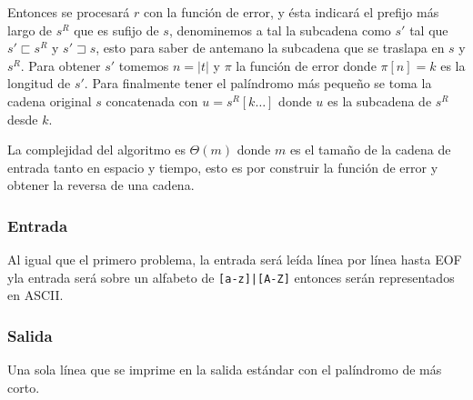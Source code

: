 Entonces se procesará $r$ con la función de error, y ésta indicará el prefijo más largo de $s^R$
que es sufijo de $s$, denominemos a tal la subcadena como $s'$ tal que $s' \sqsubset s^R$ y
$s' \sqsupset s$, esto para saber de antemano la subcadena que se traslapa en $s$ y $s^R$. Para
obtener $s'$ tomemos $n = \vert t \vert$ y $\pi$ la función de error donde $\pi[n] = k$ es la 
longitud de $s'$. Para finalmente tener el palíndromo más pequeño se toma la cadena original $s$
concatenada con $u = s^R[k \ldots]$ donde $u$ es la subcadena de $s^R$ desde $k$.

La complejidad del algoritmo es $\Theta(m)$ donde $m$ es el tamaño de la cadena de entrada tanto
en espacio y tiempo, esto es por construir la función de error y obtener la reversa de una cadena.

\subsubsection{Entrada}
Al igual que el primero problema, la entrada será leída línea por línea hasta EOF yla
entrada será sobre un alfabeto de \texttt{[a-z]|[A-Z]} entonces serán representados en ASCII.

\subsubsection{Salida}
Una sola línea que se imprime en la salida estándar con el palíndromo de más corto.

